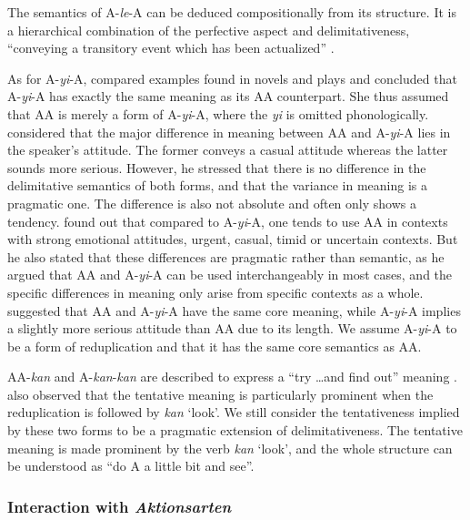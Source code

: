 The semantics of A-\textit{le}-A can be deduced compositionally from its structure. 
It is a hierarchical combination of the perfective aspect and delimitativeness, ``conveying a transitory event which has been actualized'' \citep[151]{XiaoMcEnery2004}.


As for A-\textit{yi}-A, \citet[273]{Fan1964} compared examples found in novels and plays and concluded that A-\textit{yi}-A has exactly the same meaning as its AA counterpart.
She thus assumed that AA is merely a form of A-\textit{yi}-A, where the \textit{yi} is omitted phonologically.
\citet{Xing2000} considered that the major  difference in meaning  between AA and A-\textit{yi}-A lies in the speaker's attitude.
The former conveys a casual attitude whereas the latter sounds more serious.
However, he stressed that there is no difference in the delimitative semantics of both forms,
and that the variance in meaning is a pragmatic one.
The difference is also not absolute and often only shows a tendency.
\citet{Xu2002} found out that compared to A-\textit{yi}-A, one tends to use AA in contexts with strong emotional attitudes, urgent, casual, timid or uncertain contexts.
But he also stated that these differences are pragmatic rather than semantic, 
as he argued that AA and A-\textit{yi}-A can be used interchangeably in most cases,
and the specific differences in meaning only arise from specific contexts as a whole.
\citet[15]{Yang2003} suggested that AA and A-\textit{yi}-A have the same core meaning, while A-\textit{yi}-A implies a slightly more serious attitude than AA due to its length.
We assume A-\textit{yi}-A to be a form of reduplication and that it has the same core semantics as AA.

AA-\textit{kan} and A-\textit{kan}-\textit{kan} are described to express a ``try \ldots and find out'' meaning \citep[63]{Cheng2012}.
\citet[290]{Tsao2001} also observed that the tentative meaning is particularly prominent when the reduplication is followed by \textit{kan} `look'.
We still consider the tentativeness implied by these two forms to be a pragmatic extension of delimitativeness.
The tentative meaning is made prominent by the verb \textit{kan} `look',
and the whole structure can be understood as ``do A a little bit and see''.




\subsubsection{Interaction with \textit{Aktionsarten}}\label{sec:Aktionsarten}

